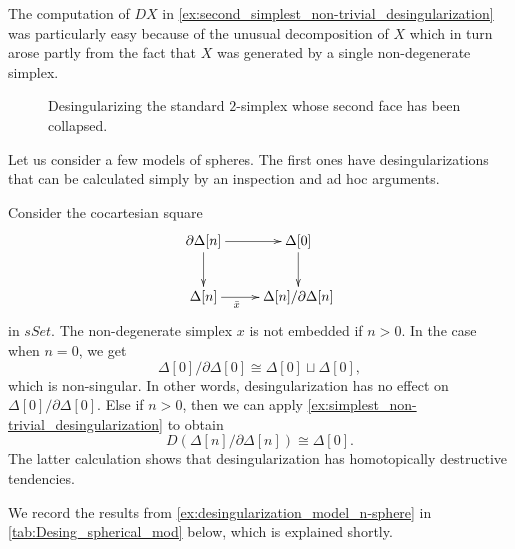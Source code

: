 \noindent The computation of $DX$ in \cref{ex:second_simplest_non-trivial_desingularization} was particularly easy because of the unusual decomposition of $X$ which in turn arose partly from the fact that $X$ was generated by a single non-degenerate simplex.

\begin{figure}
\centering
{}
\caption{Desingularizing the standard $2$-simplex whose second face has been collapsed.}
\label{fig:ch2_Desing_2simpl_collapsed_second_face}
\end{figure}

Let us consider a few models of spheres. The first ones have desingularizations that can be calculated simply by an inspection and ad hoc arguments.
\begin{example}\label{ex:desingularization_model_n-sphere}
Consider the cocartesian square
\begin{displaymath}
\xymatrix{
\partial \Delta [n] \ar[d] \ar[r] & \Delta [0] \ar[d] \\
\Delta [n] \ar[r]_(.35){\bar{x} } & \Delta [n]/\partial \Delta [n]
}
\end{displaymath}
in $sSet$. The non-degenerate simplex $x$ is not embedded if $n>0$. In the case when $n=0$, we get
\[\Delta [0]/\partial \Delta [0]\cong \Delta [0]\sqcup \Delta [0],\]
which is non-singular. In other words, desingularization has no effect on $\Delta [0]/\partial \Delta [0]$. Else if $n>0$, then we can apply \cref{ex:simplest_non-trivial_desingularization} to obtain
\[D(\Delta [n]/\partial \Delta [n])\cong \Delta [0].\]
The latter calculation shows that desingularization has homotopically destructive tendencies.
\end{example}
\noindent We record the results from \cref{ex:desingularization_model_n-sphere} in \cref{tab:Desing_spherical_mod} below, which is explained shortly.

